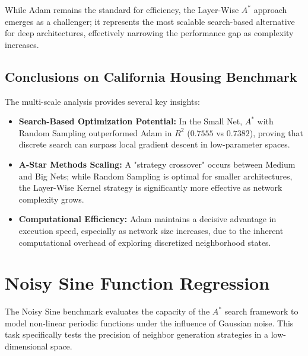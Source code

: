 While Adam remains the standard for efficiency, the Layer-Wise $A^*$ approach emerges as a challenger; it represents the most scalable search-based alternative for deep architectures, effectively narrowing the performance gap as complexity increases.
\subsection{Conclusions on California Housing Benchmark}

The multi-scale analysis provides several key insights:

\begin{itemize}
    \item \textbf{Search-Based Optimization Potential:} In the Small Net, $A^*$ with Random Sampling outperformed Adam in $R^2$ ($0.7555$ vs $0.7382$), proving that discrete search can surpass local gradient descent in low-parameter spaces.
    \item \textbf{A-Star Methods Scaling:} A "strategy crossover" occurs between Medium and Big Nets; while Random Sampling is optimal for smaller architectures, the Layer-Wise Kernel strategy is significantly more effective as network complexity grows.
    \item \textbf{Computational Efficiency:} Adam maintains a decisive advantage in execution speed, especially as network size increases, due to the inherent computational overhead of exploring discretized neighborhood states.
\end{itemize}





\newpage

\section{Noisy Sine Function Regression}
\label{sec:results_sine}

The Noisy Sine benchmark evaluates the capacity of the $A^*$ search framework to model non-linear periodic functions under the influence of Gaussian noise. This task specifically tests the precision of neighbor generation strategies in a low-dimensional space.


